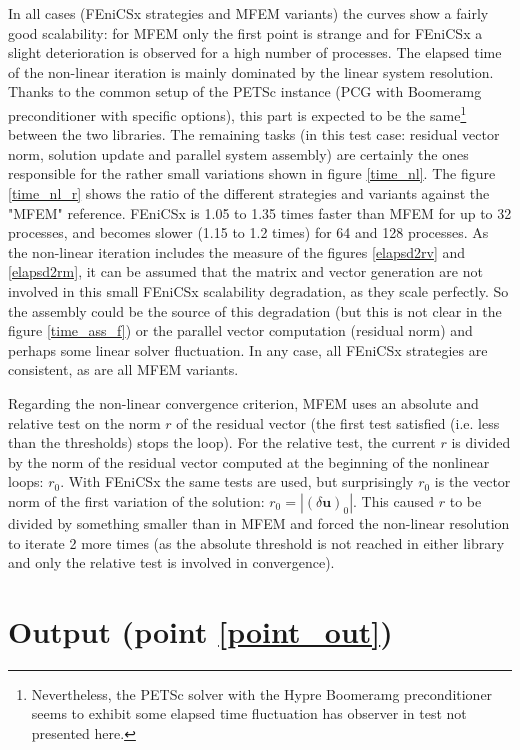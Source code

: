 \documentclass[12pt]{article}
\newcommand{\f}[1]{FEniCSx#1}
\newcommand{\vm}[1]{
	{\ensuremath{\mathbf{#1}}}
}
\begin{document}
In all cases (\f{} strategies and MFEM variants) the curves show a fairly good scalability: for MFEM only the first point is strange and for \f{} a slight deterioration is observed for a high number of processes.
The elapsed time of the non-linear iteration is mainly dominated by the linear system resolution.
Thanks to the common setup of the PETSc instance (PCG with Boomeramg preconditioner with specific options), this part is expected to be the same\footnote{Nevertheless, the PETSc solver with the Hypre Boomeramg preconditioner seems to exhibit some elapsed time fluctuation has observer in test not presented here.} between the two libraries. 
The remaining tasks (in this test case: residual vector norm, solution update and parallel system assembly) are certainly the ones responsible for the rather small variations shown in figure \ref{time_nl}. 
The figure \ref{time_nl_r} shows the ratio of the different strategies and variants against the "{\color{MFEMGreen}MFEM}" reference.
\f{} is 1.05 to 1.35 times faster than MFEM for up to 32 processes, and becomes slower (1.15 to 1.2 times) for 64 and 128 processes.
As the non-linear iteration includes the measure of the figures \ref{elapsd2rv} and \ref{elapsd2rm}, it can be assumed that the matrix and vector generation are not involved in this small \f{} scalability degradation, as they scale perfectly.
So the assembly could be the source of this degradation (but this is not clear in the figure \ref{time_ass_f}) or the parallel vector computation (residual norm) and perhaps some linear solver fluctuation. 
In any case, all \f{} strategies are consistent, as are all MFEM variants.

\bigskip 
Regarding the non-linear convergence criterion, MFEM uses an absolute and relative test on the norm $r$ of the residual vector (the first test satisfied (i.e. less than the thresholds) stops the loop).
For the relative test, the current $r$ is divided by the norm of the residual vector computed at the beginning of the nonlinear loops: $r_0$. 
With \f{} the same tests are used, but surprisingly $r_0$ is the vector norm of the first variation of the solution: $r_0=|\left( \delta \vm{u} \right)_0|$.
This caused $r$ to be divided by something smaller than in MFEM and forced the non-linear resolution to iterate 2 more times (as the absolute threshold is not reached in either library and only the relative test is involved in convergence).
\section{Output (point \ref{point_out})}
\end{document}
